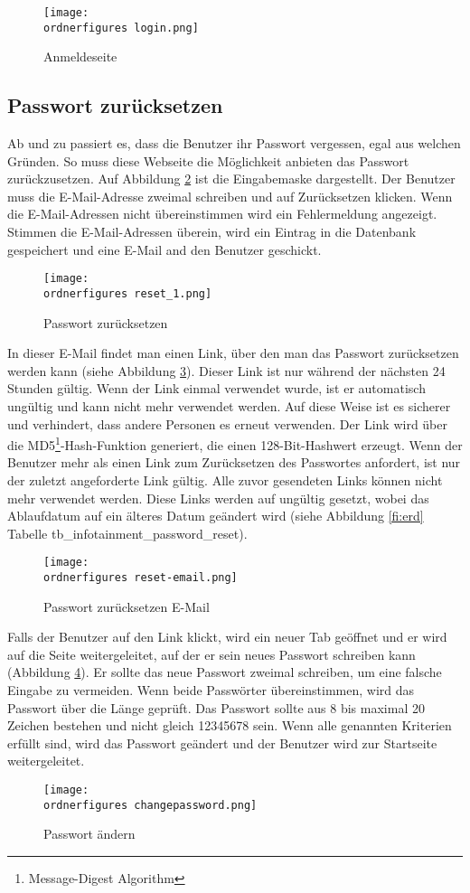 \begin{figure}[H]
	\centering
	\texttt{[image: \\ordnerfigures login.png]}
	\caption{Anmeldeseite}
	\label{fi:login}
\end{figure}

\subsection{Passwort zurücksetzen}
Ab und zu passiert es, dass die Benutzer ihr Passwort vergessen, egal aus welchen Gründen. So muss diese Webseite die Möglichkeit anbieten das Passwort zurückzusetzen. Auf Abbildung \ref{fi:reset} ist die Eingabemaske dargestellt. Der Benutzer muss die E-Mail-Adresse zweimal schreiben und auf Zurücksetzen klicken. Wenn die E-Mail-Adressen nicht übereinstimmen wird ein Fehlermeldung angezeigt. Stimmen die E-Mail-Adressen überein, wird ein Eintrag in die Datenbank gespeichert und eine E-Mail and den Benutzer geschickt.
\begin{figure}[H]
	\centering
	\texttt{[image: \\ordnerfigures reset\_1.png]}
	\caption{Passwort zurücksetzen}
	\label{fi:reset}
\end{figure}

In dieser E-Mail findet man einen Link, über den man das Passwort zurücksetzen werden kann (siehe Abbildung \ref{fi:resetemail}). Dieser Link ist nur während der nächsten 24 Stunden gültig. Wenn der Link einmal verwendet wurde, ist er automatisch ungültig und kann nicht mehr verwendet werden. Auf diese Weise ist es sicherer und verhindert, dass andere Personen es erneut verwenden. Der Link wird über die MD5\footnote{Message-Digest Algorithm }-Hash-Funktion generiert, die einen 128-Bit-Hashwert erzeugt. Wenn der Benutzer mehr als einen Link zum Zurücksetzen des Passwortes anfordert, ist nur der zuletzt angeforderte Link gültig. Alle zuvor gesendeten Links können nicht mehr verwendet werden. Diese Links werden auf ungültig gesetzt, wobei das Ablaufdatum auf ein älteres Datum geändert wird (siehe Abbildung \ref{fi:erd} Tabelle tb\_infotainment\_password\_reset). 

\begin{figure}[H]
	\centering
	\texttt{[image: \\ordnerfigures reset-email.png]}
	\caption{Passwort zurücksetzen E-Mail}
	\label{fi:resetemail}
\end{figure}

Falls der Benutzer auf den Link klickt, wird ein neuer Tab geöffnet und er wird auf die Seite weitergeleitet, auf der er sein neues Passwort schreiben kann (Abbildung \ref{fi:reset-password}). Er sollte das neue Passwort zweimal schreiben, um eine falsche Eingabe zu vermeiden. Wenn beide Passwörter übereinstimmen, wird das Passwort über die Länge geprüft. Das Passwort sollte aus 8 bis maximal 20 Zeichen bestehen und nicht gleich 12345678 sein.
Wenn alle genannten Kriterien erfüllt sind, wird das Passwort geändert und der Benutzer wird zur Startseite weitergeleitet.
\begin{figure}[H]
	\centering
	\texttt{[image: \\ordnerfigures changepassword.png]}
	\caption{Passwort ändern}
	\label{fi:reset-password}
\end{figure}

